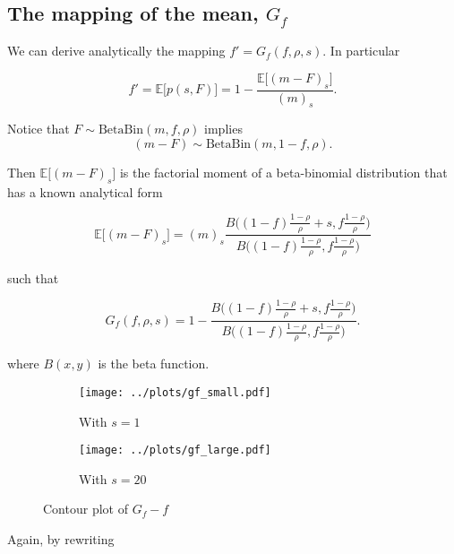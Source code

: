 \documentclass[american, abstract=on]{scrartcl}
\theoremstyle{plain}
\newcommand{\E}{\mathbb{E}}
\newcommand{\Beta}{\text{Beta}}
\newcommand{\Bin}{\text{Bin}}
\begin{document}
\subsection{The mapping of the mean, $G_f$}

We can derive analytically the mapping $f' = G_f(f, \rho, s)$. In particular

\begin{equation}
    f' = \E\big[p(s, F)\big] = 1 - \frac{\E\big[(m - F)_s\big]}{(m)_s}.
\end{equation}

Notice that $F \sim \Beta\Bin(m, f, \rho)$ implies \begin{equation}(m - F) \sim \Beta\Bin(m, 1 - f, \rho).\end{equation}

Then $\E\big[(m - F)_s\big]$ is the factorial moment of a beta-binomial distribution that has a known analytical form

\begin{equation}
    \E\big[(m - F)_s\big] = (m)_s \frac{B\Big( (1 - f) \frac{1 - \rho}{\rho} + s, f \frac{1 - \rho}{\rho} \Big)}{B\Big( (1 - f) \frac{1 - \rho}{\rho}, f \frac{1 - \rho}{\rho} \Big)}
\end{equation}

such that

\begin{equation}
    G_f(f, \rho, s) = 1 - \frac{B\Big( (1 - f) \frac{1 - \rho}{\rho} + s, f \frac{1 - \rho}{\rho} \Big)}{B\Big( (1 - f) \frac{1 - \rho}{\rho}, f \frac{1 - \rho}{\rho} \Big)}.
\end{equation}

where $B(x, y)$ is the beta function.

\begin{figure}[H]
    \centering
    \begin{subfigure}{.5\textwidth}
      \centering
      \texttt{[image: ../plots/gf\_small.pdf]} 
      \caption{With $s = 1$}
      \label{fig:gf:small}  
    \end{subfigure}%
    \begin{subfigure}{.5\textwidth}
      \centering
      \texttt{[image: ../plots/gf\_large.pdf]}       
      \caption{With $s = 20$}
      \label{fig:gf:large}
    \end{subfigure}
    \caption{Contour plot of $G_f - f$}
    \label{fig:gf}
  \end{figure}

Again, by rewriting
\end{document}
